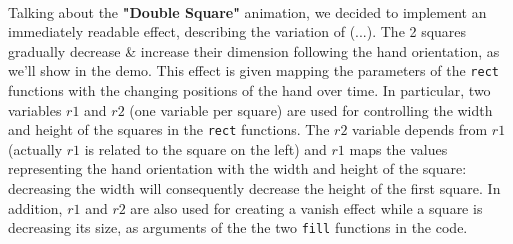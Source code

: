 \documentclass[a4paper,12pt]{report}
\begin{document}
\\Talking about the \textbf{"Double Square"} animation, we decided to implement an immediately readable effect, describing the variation of (...). The 2 squares gradually decrease \& increase their dimension following the hand orientation, as we'll show in the demo. This effect is given mapping the parameters of the \texttt{rect} functions with the changing positions of the hand over time. In particular, two variables $r1$ and $r2$ (one variable per square) are used for controlling the width and height of the squares in the \texttt{rect} functions. The $r2$ variable depends from $r1$ (actually $r1$ is related to the square on the left) and $r1$ maps the values representing the hand orientation with the width and height of the square: decreasing the width will consequently decrease the height of the first square. In addition, $r1$ and $r2$ are also used for creating a vanish effect while a square is decreasing its size, as arguments of the the two \texttt{fill} functions in the code.
\end{document}
